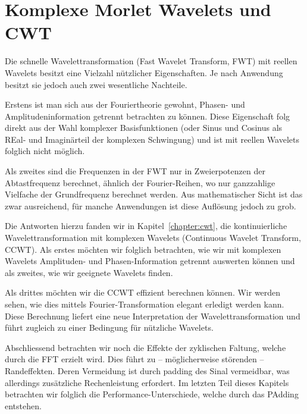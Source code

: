 %
%
%

\chapter{Komplexe Morlet Wavelets und CWT\label{chapter:thema}}
\begin{refsection}

Die schnelle Wavelettransformation (Fast Wavelet Transform, FWT) mit reellen Wavelets besitzt eine Vielzahl nützlicher Eigenschaften.
Je nach Anwendung besitzt sie jedoch auch zwei wesentliche Nachteile.

Erstens ist man sich aus der Fouriertheorie gewohnt, Phasen- und Amplitudeninformation getrennt betrachten zu können.
Diese Eigenschaft folg direkt aus der Wahl komplexer Basisfunktionen (oder Sinus und Cosinus als REal- und Imaginärteil der komplexen Schwingung) und ist mit reellen Wavelets folglich nicht möglich.

Als zweites sind die Frequenzen in der FWT nur in Zweierpotenzen der Abtastfrequenz berechnet, ähnlich der Fourier-Reihen, wo nur ganzzahlige Vielfache der Grundfrequenz berechnet werden.
Aus mathematischer Sicht ist das zwar ausreichend, für manche Anwendungen ist diese Auflösung jedoch zu grob.

Die Antworten hierzu fanden wir in Kapitel~\ref{chapter:cwt}, die kontinuierliche Wavelettransformation mit komplexen Wavelets (Continuous Wavelet Transform, CCWT).
Als erstes möchten wir folglich betrachten, wie wir mit komplexen Wavelets Amplituden- und Phasen-Information getrennt auswerten können und als zweites, wie wir geeignete Wavelets finden.

Als drittes möchten wir die CCWT effizient berechnen können.
Wir werden sehen, wie dies mittels Fourier-Transformation elegant erledigt werden kann.
Diese Berechnung liefert eine neue Interpretation der Wavelettransformation und führt zugleich zu einer Bedingung für nützliche Wavelets.

Abschliessend betrachten wir noch die Effekte der zyklischen Faltung, welche durch die FFT erzielt wird.
Dies führt zu -- möglicherweise störenden -- Randeffekten.
Deren Vermeidung ist durch padding des Sinal vermeidbar, was allerdings zusätzliche Rechenleistung erfordert.
Im letzten Teil dieses Kapitels betrachten wir folglich die Performance-Unterschiede, welche durch das PAdding entstehen.



\end{refsection}
